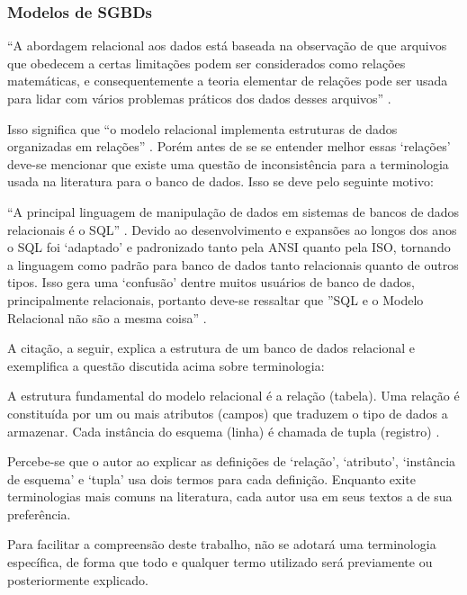 \subsubsection{Modelos de SGBDs}\label{sgbdr}

\begin{citacao}
    ``A abordagem relacional aos dados está baseada na observação de que arquivos que obedecem a certas limitações podem ser considerados como relações matemáticas, e consequentemente a teoria elementar de relações pode ser usada para lidar com vários problemas práticos dos dados desses arquivos'' \cite[p.77]{date1989introducao}.
\end{citacao}

Isso significa que ``o modelo relacional implementa estruturas de dados organizadas em relações'' \cite[p.8]{takai2005intro}. 
Porém antes de se se entender melhor essas `relações' deve-se mencionar que existe uma questão de inconsistência para a terminologia usada na literatura para o banco de dados. Isso se deve pelo seguinte motivo:

``A principal linguagem de manipulação de dados em sistemas de bancos de dados relacionais é o SQL'' \cite[p.9]{alexandruk2011modelagem}. Devido ao desenvolvimento e expansões ao longos dos anos o SQL foi `adaptado' e padronizado tanto pela ANSI quanto pela ISO, tornando a linguagem como padrão para banco de dados tanto relacionais quanto de outros tipos. Isso gera uma `confusão' dentre muitos usuários de banco de dados, principalmente relacionais, portanto deve-se ressaltar que ''SQL e o Modelo Relacional não são a mesma coisa'' \cite{date2011sql}.

A citação, a seguir, explica a estrutura de um banco de dados relacional e exemplifica a questão discutida acima sobre terminologia:
\begin{citacao}
    A estrutura fundamental do modelo relacional é a relação (tabela). Uma relação é constituída por um ou mais atributos (campos) que traduzem o tipo de dados a armazenar. Cada instância do esquema (linha) é chamada de tupla (registro) \cite[p.8]{takai2005intro}.
\end{citacao}


Percebe-se que o autor ao explicar as definições de `relação', `atributo', `instância de esquema' e `tupla' usa dois termos para cada definição. Enquanto exite terminologias mais comuns na literatura, cada autor usa em seus textos a de sua preferência. 

Para facilitar a compreensão deste trabalho, não se adotará uma terminologia específica, de forma que todo e qualquer termo utilizado será previamente ou posteriormente explicado. 

